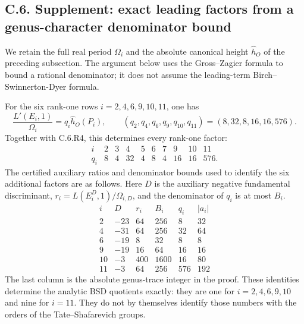 \subsection{C.6. Supplement: exact leading factors from a genus-character denominator bound}

We retain the full real period $\Omega_i$ and the absolute canonical
height $\widehat h_O$ of the preceding subsection. The argument below
uses the Gross--Zagier formula to bound a rational denominator; it does
not assume the leading-term Birch--Swinnerton-Dyer formula.

\begin{proposition}\label{ari:C.6.R5}
For the six rank-one rows $i=2,4,6,9,10,11$, one has
\[
 \frac{L'(E_i,1)}{\Omega_i}
   =q_i\widehat h_O(P_i),\qquad
 (q_2,q_4,q_6,q_9,q_{10},q_{11})=(8,32,8,16,16,576).
\]
Together with C.6.R4, this determines every rank-one factor:
\[
\begin{array}{c|rrrrrrrrr}
 i&2&3&4&5&6&7&9&10&11\\\hline
 q_i&8&4&32&4&8&4&16&16&576.
\end{array}
\]
The certified auxiliary ratios and denominator bounds used to identify
the six additional factors are as follows. Here $D$ is the auxiliary
negative fundamental discriminant,
$r_i=L(E_i^D,1)/\Omega_{i,D}$, and the denominator of $q_i$ is at most
$B_i$.
\[
\begin{array}{c|r|r|r|r|r}
 i&D&r_i&B_i&q_i&|a_i|\\\hline
 2&-23&64&256&8&32\\
 4&-31&64&256&32&64\\
 6&-19&8&32&8&8\\
 9&-19&16&64&16&16\\
 10&-3&400&1600&16&80\\
 11&-3&64&256&576&192
\end{array}
\]
The last column is the absolute genus-trace integer in the proof. These
identities determine the analytic BSD quotients exactly: they are one
for $i=2,4,6,9,10$ and nine for $i=11$. They do not by themselves
identify those numbers with the orders of the Tate--Shafarevich groups.
\end{proposition}

